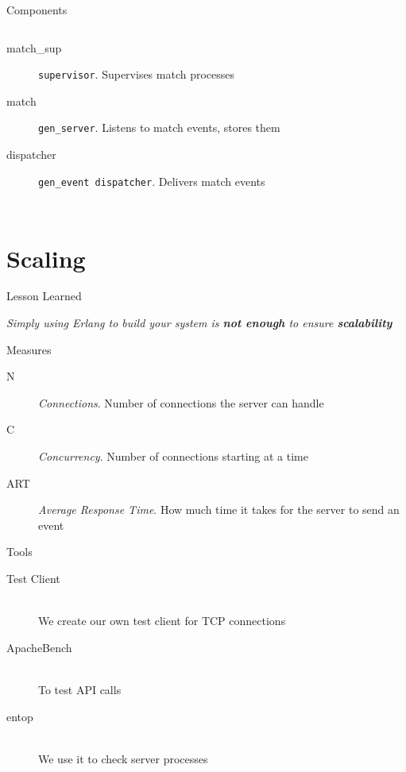 \documentclass[utf8,hyperref={colorlinks=true}]{beamer}
\begin{document}
\begin{frame}{Components}
\begin{columns}
{\begin{description}
					\item[match\_sup]
						\texttt{supervisor}. Supervises match processes
					\item[match]
						\texttt{gen\_server}. Listens to match events, stores them
					\item[dispatcher]
						\texttt{gen\_event dispatcher}. Delivers match events
				\end{description}}
	\end{columns}
\end{frame}

\section{Scaling}
\begin{frame}{Lesson Learned}
	\begin{center}
		\huge \emph{Simply using Erlang to build your system is \textbf{not enough} to ensure \textbf{scalability}}
	\end{center}
\end{frame}

\begin{frame}{Measures}
	\begin{description}
		\item[N] \emph{Connections}. Number of connections the server can handle
		\item[C] \emph{Concurrency}. Number of connections starting at a time
		\item[ART] \emph{Average Response Time}. How much time it takes for the server to send an event
	\end{description}
\end{frame}
\begin{frame}{Tools}
	\begin{description}
		\item[Test Client]~\\ We create our own test client for TCP connections
		\item[ApacheBench]~\\ To test API calls
		\item[entop]~\\ We use it to check server processes
	\end{description}
\end{frame}
\end{document}
